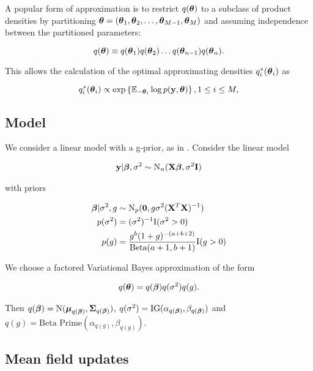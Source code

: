 \documentclass{amsart}[12pt]
\begin{document}
A popular form of approximation is to restrict $q({\boldsymbol \theta})$ to a subclass of product densities by partitioning
${\boldsymbol \theta} = ({\boldsymbol \theta}_1, {\boldsymbol \theta}_2, \ldots, {\boldsymbol \theta}_{M-1}, {\boldsymbol \theta}_M)$ and assuming independence between the
partitioned parameters:

\begin{equation*}
q({\boldsymbol \theta}) \equiv q({\boldsymbol \theta}_1) q({\boldsymbol \theta}_2) \ldots q({\boldsymbol \theta}_{n-1}) q({\boldsymbol \theta}_n).
\end{equation*}

This allows the calculation of the optimal approximating densities $q_i^*({\boldsymbol \theta}_i)$ as

\begin{equation*}
q_i^*({\boldsymbol \theta}_i) \propto \exp \left \{ \mathbb{E}_{-{\boldsymbol \theta}_i} \log p({\bf y}, {\boldsymbol \theta}) \right \}, 1 \leq i \leq M,
\end{equation*}

\subsection{Model}

We consider a linear model with a g-prior, as in \cite{Liang2008}. Consider the linear model

\begin{align*}
{\bf y} | {\boldsymbol \beta}, \sigma^2 \sim \text{N}_n({\bf X} {\boldsymbol \beta}, \sigma^2 {\bf I})
\end{align*}

with priors

\begin{align*}
{\boldsymbol\beta} | \sigma^2, g &\sim \text{N}_p({\bf 0}, g \sigma^2 ({\bf X}^T {\bf X})^{-1}) \\
p(\sigma^2) &= (\sigma^2)^{-1} \text{I}(\sigma^2 > 0) \\
p(g) &= \frac{g^b (1 + g)^{-(a + b + 2)}}{\text{Beta}(a + 1, b + 1)} \text{I}(g > 0)
\end{align*}

We choose a factored Variational Bayes approximation of the form

\begin{align*}
q({\boldsymbol \theta}) = q({\boldsymbol \beta}) q(\sigma^2) q(g).
\end{align*}

Then $q({\boldsymbol \beta}) = \text{N}({\boldsymbol \mu}_{q({\boldsymbol \beta})}, {\boldsymbol \Sigma}_{q({\boldsymbol \beta})})$, $q(\sigma^2) = \text{IG}(\alpha_{q({\boldsymbol \beta})}, \beta_{q({\boldsymbol \beta})})$ and $q(g) = \text{Beta Prime}(\alpha_{q(g)}, \beta_{q(g)})$.

\subsection{Mean field updates}
\end{document}

